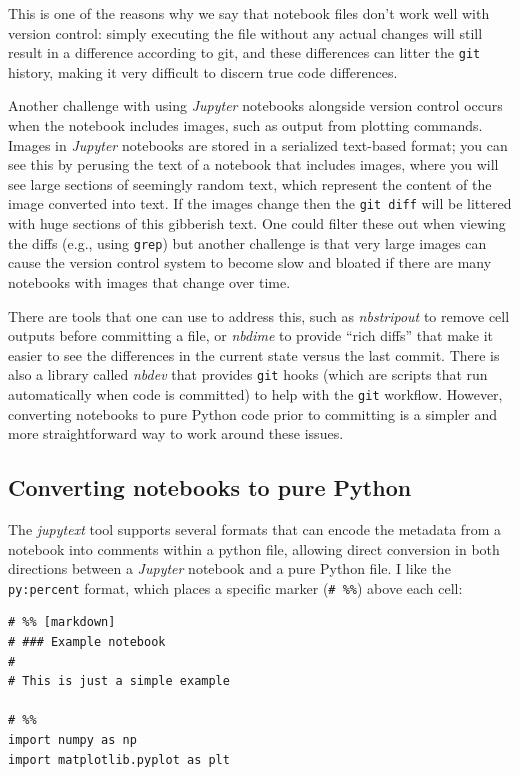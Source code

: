 This is one of the reasons why we say that notebook files don't work well with version control: simply executing the file without any actual changes will still result in a difference according to git, and these differences can litter the \texttt{git} history, making it very difficult to discern true code differences.

Another challenge with using \textit{Jupyter} notebooks alongside version control occurs when the notebook includes images, such as output from plotting commands.  Images in \textit{Jupyter} notebooks are stored in a serialized text-based format; you can see this by perusing the text of a notebook that includes images, where you will see large sections of seemingly random text, which represent the content of the image converted into text.  If the images change then the \texttt{git diff} will be littered with huge sections of this gibberish text.  One could filter these out when viewing the diffs (e.g., using \texttt{grep}) but another challenge is that very large images can cause the version control system to become slow and bloated if there are many notebooks with images that change over time.

There are tools that one can use to address this, such as \textit{nbstripout} to remove cell outputs before committing a file, or \textit{nbdime} to provide ``rich diffs'' that make it easier to see the differences in the current state versus the last commit. There is also a library called \textit{nbdev} that provides \texttt{git} hooks (which are scripts that run automatically when code is committed) to help with the \texttt{git} workflow.  However, converting notebooks to pure Python code prior to committing is a simpler and more straightforward way to work around these issues.

\subsection{Converting notebooks to pure Python}

The \textit{jupytext} tool supports several formats that can encode the metadata from a notebook into comments within a python file, allowing direct conversion in both directions between a \textit{Jupyter} notebook and a pure Python file. I like the \texttt{py:percent} format, which places a specific marker (\texttt{\# \%\%}) above each cell:

\begin{lstlisting}[style=Python]
# %% [markdown]
# ### Example notebook
#
# This is just a simple example

# %%
import numpy as np
import matplotlib.pyplot as plt
\end{lstlisting}

